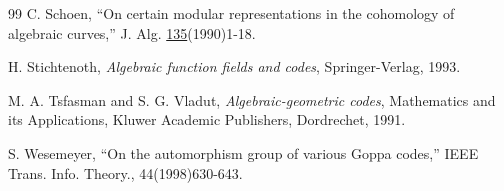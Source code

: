 \documentclass[12pt]{article}
\numberwithin{equation}{section}
\begin{document}
\begin{thebibliography}{99}
C. Schoen, ``On certain modular representations 
in the cohomology 
of algebraic curves,'' J. Alg. \underline{135}(1990)1-18.


%

 H. Stichtenoth, {\it Algebraic function
fields and codes}, Springer-Verlag, 1993.

M. A. Tsfasman and S. G. Vladut, {\it Algebraic-geometric codes},
Mathematics and its Applications, 
Kluwer Academic Publishers, Dordrechet, 1991.

 S. Wesemeyer, 
``On the automorphism group of 
various Goppa codes,''
IEEE Trans. Info. Theory., 44(1998)630-643.
\end{thebibliography}
\end{document}
